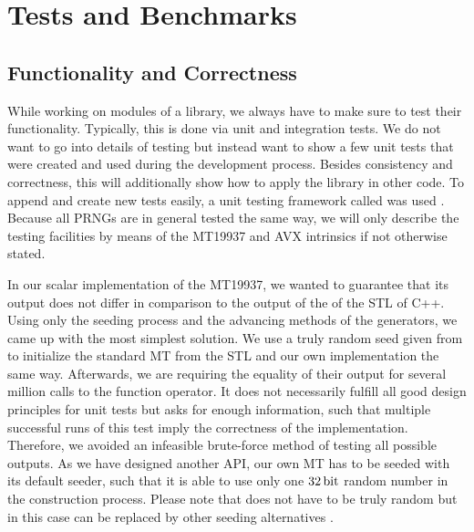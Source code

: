 \documentclass{stdlocal}
\begin{document}
\section{Tests and Benchmarks} %
\label{sec:testing_framework}

  \subsection{Functionality and Correctness} %
  \label{sub:unit_tests}
    While working on modules of a library, we always have to make sure to test their functionality.
    Typically, this is done via unit and integration tests.
    We do not want to go into details of testing but instead want to show a few unit tests that were created and used during the development process.
    Besides consistency and correctness, this will additionally show how to apply the library in other code.
    To append and create new tests easily, a unit testing framework called  was used \autocite{doctest}.
    Because all PRNGs are in general tested the same way, we will only describe the testing facilities by means of the MT19937 and AVX intrinsics if not otherwise stated.

    In our scalar implementation of the MT19937, we wanted to guarantee that its output does not differ in comparison to the output of the  of the STL of C++.
    Using only the seeding process and the advancing methods of the generators, we came up with the most simplest solution.
    We use a truly random seed given from  to initialize the standard MT from the STL and our own implementation the same way.
    Afterwards, we are requiring the equality of their output for several million calls to the function operator.
    It does not necessarily fulfill all good design principles for unit tests but asks for enough information, such that multiple successful runs of this test imply the correctness of the implementation.
    Therefore, we avoided an infeasible brute-force method of testing all possible outputs.
    As we have designed another API, our own MT has to be seeded with its default seeder, such that it is able to use only one $32\, \mathrm{bit}$ random number in the construction process.
    Please note that  does not have to be truly random \autocite{oneill-blog-rd,oneill-blog-seeding-surprises} but in this case can be replaced by other seeding alternatives \autocite{oneill-blog-seed-entropy}.
\end{document}
